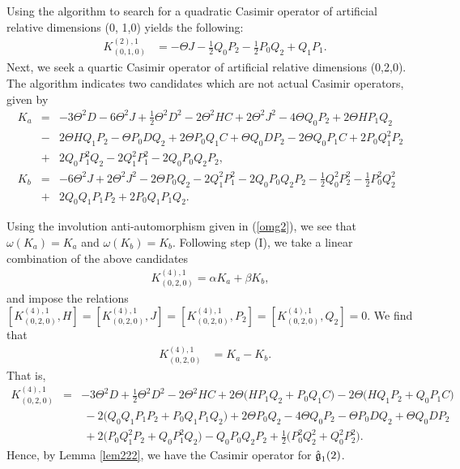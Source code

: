 \documentclass[12pt]{article}
\begin{document}
Using the algorithm to search for a quadratic Casimir operator of artificial relative dimensions
(0, 1,0) yields the following:
\begin{eqnarray}
&K^{(2),1}_{(0,1,0)}&=-\Theta J- \frac{1}{2} Q_{0} P_{2}- \frac{1}{2} P_{0} Q_{2}+ Q_{1}P_{1}.\label{F2}
\end{eqnarray}
Next, we seek a quartic Casimir operator of artificial relative dimensions
(0,2,0). The algorithm indicates two candidates which are not actual Casimir
operators, given by
 \begin{eqnarray*}
  K_a&=& -3 \Theta ^2D-6 \Theta ^2 J+\frac{1}{2} \Theta ^2 D^{2}-2 \Theta ^2 HC+2 \Theta ^2 J^2 - 4 \Theta  Q_{0} P_{2}+2 \Theta HP_{1}Q_{2} 
 \nonumber\\
 &-& 2 \Theta  HQ_{1}P_{2} -\Theta  P_{0} D Q_{2}+2 \Theta   P_{0}Q_{1}C +\Theta  Q_{0} D P_{2}-2 \Theta  Q_{0}P_{1}C +2 P_{0}  Q^2_{1} P_{2}
 \nonumber\\
 &+& 2 Q_{0}  P^2_{1} Q_{2}-2 Q^2_{1} P^2_{1}  -2 Q_{0}  P_{0}Q_{2} P_{2},
  \nonumber\\
   K_b&=&-6 \Theta ^2 J+2 \Theta ^2 J^2- 2 \Theta  P_{0} Q_{2}- 2 Q^2_{1} P^2_{1}- 2 Q_{0}P_{0}Q_{2} P_{2}- \frac{1}{2}Q^2_{0} P^2_{2} -\frac{1}{2}  P^2_{0} Q^2_{2} \nonumber\\
 &+&  2Q_{0} Q_{1}P_{1}P_{2}  + 2P_{0} Q_{1 }P_{1} Q_{2}. 
\end{eqnarray*}

Using the involution anti-automorphism given in (\ref{omg2}), we see that $\omega(K_a)=K_a$ and 
$\omega(K_b)=K_b$. 
Following step (I), we take a linear combination of the above candidates
 \begin{eqnarray*}
 K^{(4),1}_{(0,2,0)}=   \alpha  K_a + \beta  K_b,
 \end{eqnarray*}
  and impose the relations $ [K^{(4),1}_{(0,2,0)},
  H]=[K^{(4),1}_{(0,2,0)},J]=[K^{(4),1}_{(0,2,0)},P_ {2}]=[K^{(4),1}_{(0,2,0)},Q_
  {2}]=0.$ We find that
\begin{eqnarray*}
&K^{(4),1}_{(0,2,0)}&=  K_a-K_b .
\end{eqnarray*}
That is, 
\begin{eqnarray}
K^{(4),1}_{(0,2,0)}&=&  -3 \Theta^2 D +\frac{1}{2} \Theta^2 D^{2} -2 \Theta^2 H C+2 \Theta  \big (H P_{1}Q_{2}+ P_{0}Q_{1 }C\big) -2 \Theta  \big(H Q_{1}P_{2}+ Q_{0}P_{1 }C\big) \nonumber\\
&&\ -2\big( Q_{0} Q_{1} P_{1} P_{2}+ P_{0} Q_{1} P_{1} Q_{2} \big )+2 \Theta   P_{0} Q_{2}-4 \Theta   Q_{0} P_{2}-  \Theta  P_{0}  D  Q_{2}+ \Theta   Q_{0}  D  P_{2}\nonumber\\
&&\ +2 \big ( P_{0}Q^{2}_{1}P_{2} +Q_{0}P^{2}_{1}Q_{2} \big)- Q_{0}P_{0}Q_{2}P_{2}+\frac{1}{2} \big( P^{2}_{0} Q^{2}_{2}+ Q^{2}_{0} P^{2}_{2} \big).\label{exg1}
\end{eqnarray}
Hence, by Lemma \ref{lem222}, we have the Casimir operator for
$\mathfrak{\Hat{g}}_{1}(2)$.
\end{document}
